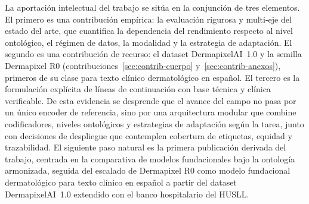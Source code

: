 La aportación intelectual del trabajo se sitúa en la conjunción de
tres elementos. El primero es una contribución empírica: la
evaluación rigurosa y multi-eje del estado del arte, que cuantifica
la dependencia del rendimiento respecto al nivel ontológico, el
régimen de datos, la modalidad y la estrategia de adaptación. El
segundo es una contribución de recurso: el dataset DermapixelAI~1.0
y la semilla Dermapixel R0
(contribuciones~\ref{sec:contrib-cuerpo}
y~\ref{sec:contrib-anexos}), primeros de su clase para texto
clínico dermatológico en español. El tercero es la formulación
explícita de líneas de continuación con base técnica y clínica
verificable. De esta evidencia se desprende que el avance del campo
no pasa por un único encoder de referencia, sino por una
arquitectura modular que combine codificadores, niveles ontológicos
y estrategias de adaptación según la tarea, junto con decisiones de
despliegue que contemplen cobertura de etiquetas, equidad y
trazabilidad. El siguiente paso natural es la primera publicación
derivada del trabajo, centrada en la comparativa de modelos
fundacionales bajo la ontología armonizada, seguida del escalado de
Dermapixel R0 como modelo fundacional dermatológico para texto
clínico en español a partir del dataset DermapixelAI~1.0 extendido
con el banco hospitalario del HUSLL.
